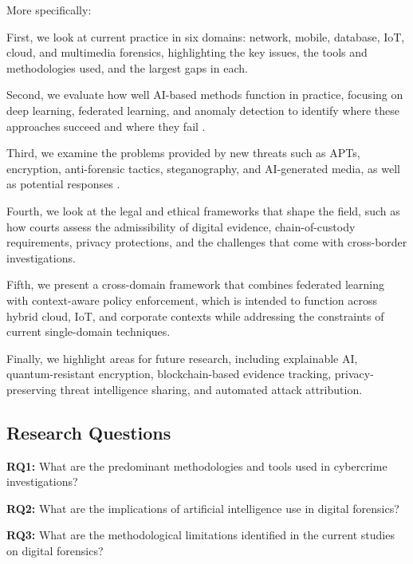 \documentclass[12pt,a4paper]{article}
\begin{document}
\begin{justify}
More specifically:


First, we look at current practice in six domains: network, mobile, database, IoT, cloud, and multimedia forensics, highlighting the key issues, the tools and methodologies used, and the largest gaps in each.


Second, we evaluate how well AI-based methods function in practice, focusing on deep learning, federated learning, and anomaly detection to identify where these approaches succeed and where they fail .


Third, we examine the problems provided by new threats such as APTs, encryption, anti-forensic tactics, steganography, and AI-generated media, as well as potential responses .


Fourth, we look at the legal and ethical frameworks that shape the field, such as how courts assess the admissibility of digital evidence, chain-of-custody requirements, privacy protections, and the challenges that come with cross-border investigations.


Fifth, we present a cross-domain framework that combines federated learning with context-aware policy enforcement, which is intended to function across hybrid cloud, IoT, and corporate contexts while addressing the constraints of current single-domain techniques.


Finally, we highlight areas for future research, including explainable AI, quantum-resistant encryption, blockchain-based evidence tracking, privacy-preserving threat intelligence sharing, and automated attack attribution.



\subsection{Research Questions}


\vspace{0.2cm}

\textbf{RQ1:} What are the predominant methodologies and tools used in cybercrime investigations?

\vspace{0.2cm}

\textbf{RQ2:} What are the implications of artificial intelligence use in digital forensics?

\vspace{0.2cm}

\textbf{RQ3:} What are the methodological limitations identified in the current studies on digital forensics?


\end{justify}
\end{document}
